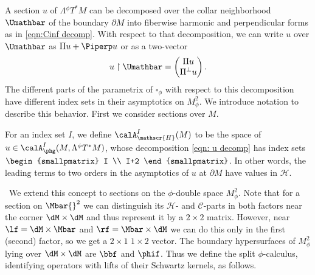 A section $u$ of $\Lambda {}^\phi T^*M$ can be decomposed over the collar neighborhood $\Umathbar$ of the
boundary $\partial M$
into fiberwise harmonic and perpendicular forms as in \eqref{eqn:Cinf decomp}. With
respect to that decomposition, we can write $u$ over $\Umathbar$ as $\Pi u+\Piperp u$ or as a two-vector%
\begin{equation}
\label{eqn: u decomp}
u \restriction \Umathbar = \begin{pmatrix}
\Pi u \\ \Pi^\perp u
\end{pmatrix}.
\end{equation}
The different parts of the parametrix of $\square_\phi$ with respect to this decomposition
have different index sets in their asymptotics on $M^2_\phi$. We introduce notation to describe
this behavior. First we consider sections over $M$.

\begin{defn} \label{def:split phg space}
For an index set $I$, we define $\calA^I_{\mathscr{H}}(M)$ to be the space of
$u\in\calA^I_{\phg}(M, \Lambda {}^\phi T^*M)$, whose
decomposition \eqref{eqn: u decomp} has index sets
$
\begin{smallpmatrix}
I \\ I+2
\end{smallpmatrix}
$.
In other words, the leading terms to two orders in the
asymptotics of $u$ at $\partial M$ have values in $\mathscr{H}$.
\end{defn}
\
We extend this concept to sections
on the $\phi$-double space
$M^2_\phi$. Note that for a section on $\Mbar{}^2$ we can distinguish its
$\mathscr{H}$- and $\mathscr{C}$-parts in both factors near the corner $\dM\times\dM$
and thus represent it by a $2\times2$ matrix. However, near $\lf=\dM\times \Mbar$
and $\rf=\Mbar\times\dM$ we can do this only in the first (\resp second) factor, so we get a $2\times1$ \resp $1\times2$ vector. The boundary hypersurfaces of $M^2_\phi$ lying over $\dM\times\dM$ are $\bbf$ and $\phif$. Thus we
define the split $\phi$-calculus, identifying operators with lifts of their Schwartz kernels, as follows.

